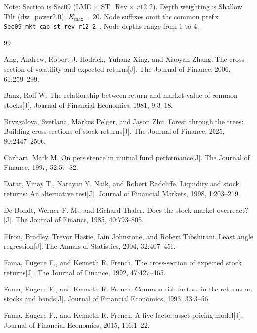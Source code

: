 \documentclass[12pt]{article}
\def\textit#1{#1}%
\begin{document}
\begin{table}[p]
\begin{threeparttable}
\begin{tablenotes}[flushleft]
\footnotesize
\item \textit{Note:} Section is Sec09 (LME $\times$ ST\_Rev $\times$ $r12\_2$). Depth weighting is Shallow Tilt (dw\_power2.0); $K_{\max}=20$. Node suffixes omit the common prefix \texttt{Sec09\_mkt\_cap\_st\_rev\_r12\_2-}. Node depths range from 1 to 4.
\end{tablenotes}
\end{threeparttable}
\end{table}

\FloatBarrier
\clearpage

\begin{thebibliography}{99}

Ang, Andrew, Robert J. Hodrick, Yuhang Xing, and Xiaoyan Zhang.
The cross-section of volatility and expected returns[J].
The Journal of Finance, 2006, 61:259--299.

Banz, Rolf W.
The relationship between return and market value of common stocks[J].
Journal of Financial Economics, 1981, 9:3--18.

Bryzgalova, Svetlana, Markus Pelger, and Jason Zhu.
Forest through the trees: Building cross-sections of stock returns[J].
The Journal of Finance, 2025, 80:2447--2506.

Carhart, Mark M.
On persistence in mutual fund performance[J].
The Journal of Finance, 1997, 52:57--82.

Datar, Vinay T., Narayan Y. Naik, and Robert Radcliffe.
Liquidity and stock returns: An alternative test[J].
Journal of Financial Markets, 1998, 1:203--219.

De Bondt, Werner F. M., and Richard Thaler.
Does the stock market overreact?[J].
The Journal of Finance, 1985, 40:793--805.

Efron, Bradley, Trevor Hastie, Iain Johnstone, and Robert Tibshirani.
Least angle regression[J].
The Annals of Statistics, 2004, 32:407--451.

Fama, Eugene F., and Kenneth R. French.
The cross-section of expected stock returns[J].
The Journal of Finance, 1992, 47:427--465.

Fama, Eugene F., and Kenneth R. French.
Common risk factors in the returns on stocks and bonds[J].
Journal of Financial Economics, 1993, 33:3--56.

Fama, Eugene F., and Kenneth R. French.
A five-factor asset pricing model[J].
Journal of Financial Economics, 2015, 116:1--22.


\end{thebibliography}
\end{document}
